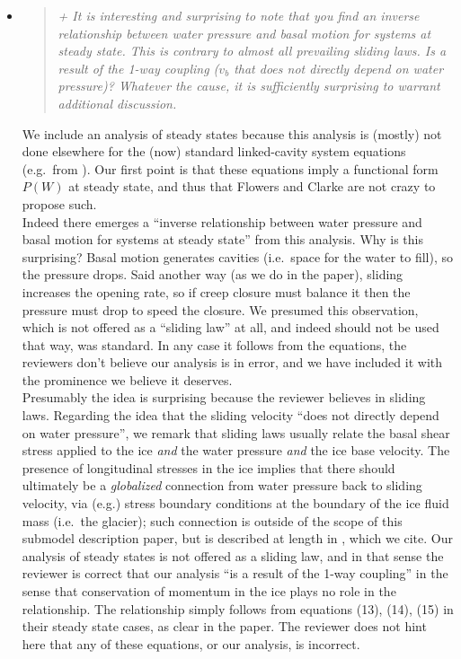 \documentclass[11pt,reqno]{amsart}
\newcommand{\reply}[2]{
\medskip\medskip
\item  \begin{quote}
\emph{#1}
\end{quote}

\medskip
\noindent #2}
\begin{document}
\begin{itemize}
\reply{+ It is interesting and surprising to note that you find an inverse relationship between
water pressure and basal motion for systems at steady state. This is contrary to almost
all prevailing sliding laws. Is a result of the 1-way coupling ($v_b$ that does not directly
depend on water pressure)? Whatever the cause, it is sufficiently surprising to warrant
additional discussion.}
{We include an analysis of steady states because this analysis is (mostly) not done elsewhere for the (now) standard linked-cavity system equations (e.g.~from \cite{Hewitt2011,Schoofetal2012}).  Our first point is that these equations imply a functional form $P(W)$ at steady state, and thus that Flowers and Clarke \cite{FlowersClarke2002} are not crazy to propose such.\\
\indent Indeed there emerges a ``inverse relationship between water pressure and basal motion for systems at steady state'' from this analysis.  Why is this surprising?  Basal motion generates cavities (i.e.~space for the water to fill), so the pressure drops.  Said another way (as we do in the paper), sliding increases the opening rate, so if creep closure must balance it then the pressure must drop to speed the closure.  We presumed this observation, which is not offered as a ``sliding law'' at all, and indeed should not be used that way, was standard.  In any case it follows from the equations, the reviewers don't believe our analysis is in error, and we have included it with the prominence we believe it deserves. \\
\indent Presumably the idea is surprising because the reviewer believes in sliding laws.  Regarding the idea that the sliding velocity ``does not directly
depend on water pressure'', we remark that sliding laws usually relate the basal shear stress applied to the ice \emph{and} the water pressure \emph{and} the ice base velocity.  The presence of longitudinal stresses in the ice implies that there should ultimately be a \emph{globalized} connection from water pressure back to sliding velocity, via (e.g.) stress boundary conditions at the boundary of the ice fluid mass (i.e.~the glacier); such connection is outside of the scope of this submodel description paper, but is described at length in \cite{BBssasliding}, which we cite.  Our analysis of steady states is not offered as a sliding law, and in that sense the reviewer is correct that our analysis ``is a result of the 1-way coupling'' in the sense that conservation of momentum in the ice plays no role in the relationship.  The relationship simply follows from equations (13), (14), (15) in their steady state cases, as clear in the paper.   The reviewer does not hint here that any of these equations, or our analysis, is incorrect.}


\end{itemize}
\end{document}
